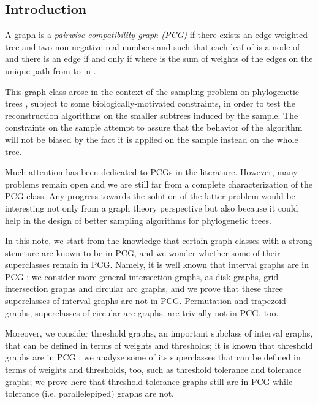 \documentclass{elsarticle}
\begin{document}
\begin{doublespace}

\section{Introduction}\label{sec:intro}

A graph  is a {\em pairwise compatibility graph (PCG)}  if there exists an edge-weighted tree  and two non-negative real numbers  and  such that each leaf  of  is a node of  and there is an edge  if and only if  where  is the sum of weights of the edges on the unique path from  to  in . 

This graph class arose in the context of the sampling problem on phylogenetic trees  \cite{Kal03}, subject to some biologically-motivated constraints, in order to test the reconstruction algorithms on the smaller subtrees induced by the sample. The constraints on the sample attempt to assure that the behavior of the algorithm will not be biased by the fact it is applied on the sample instead on the whole tree. 

Much attention has been dedicated to PCGs in the literature. However, many problems remain open and we are still far from a complete characterization of the PCG class.
Any progress towards the solution of the latter problem would be interesting not only from a graph theory perspective but also because it could help in the design of better sampling algorithms for phylogenetic trees.

In this note, we start from the knowledge that certain graph classes with a strong structure are known to be in PCG, and we wonder whether some of their superclasses remain in PCG.
Namely, it is well known that interval graphs are in PCG \cite{BH08}; we consider more general intersection graphs, as disk graphs, grid intersection graphs and circular arc graphs, and we prove that these three superclasses of interval graphs are not in PCG.
Permutation and trapezoid graphs, superclasses of circular arc graphs, are trivially not in PCG, too.

Moreover, we consider threshold graphs, an important subclass of interval graphs, that can be defined in terms of weights and thresholds; it is known that threshold graphs are in PCG  \cite{CPS11}; we analyze some of its superclasses that can be defined in terms of weights and thresholds, too, such as threshold tolerance and tolerance graphs; we prove here that threshold tolerance graphs still are in PCG while tolerance (i.e. parallelepiped) graphs are not.


\end{doublespace}
\end{document}
